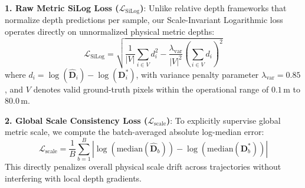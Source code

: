 \noindent\textbf{1. Raw Metric SiLog Loss ($\mathcal{L}_{\text{SiLog}}$)}:
Unlike relative depth frameworks that normalize depth predictions per sample, our Scale-Invariant Logarithmic loss operates directly on unnormalized physical metric depths:
\begin{equation}
    \mathcal{L}_{\text{SiLog}} = \sqrt{ \frac{1}{|V|} \sum_{i \in V} d_i^2 - \frac{\lambda_{\text{var}}}{|V|^2} \left( \sum_{i \in V} d_i \right)^2 }
\end{equation}
where $d_i = \log(\hat{\mathbf{D}}_i) - \log(\mathbf{D}_i^*)$, with variance penalty parameter $\lambda_{\text{var}} = 0.85$, and $V$ denotes valid ground-truth pixels within the operational range of $0.1$\,m to $80.0$\,m.

\noindent\textbf{2. Global Scale Consistency Loss ($\mathcal{L}_{\text{scale}}$)}:
To explicitly supervise global metric scale, we compute the batch-averaged absolute log-median error:
\begin{equation}
    \mathcal{L}_{\text{scale}} = \frac{1}{B} \sum_{b=1}^B \left| \log(\text{median}(\hat{\mathbf{D}}_b)) - \log(\text{median}(\mathbf{D}_b^*)) \right|
\end{equation}
This directly penalizes overall physical scale drift across trajectories without interfering with local depth gradients.

